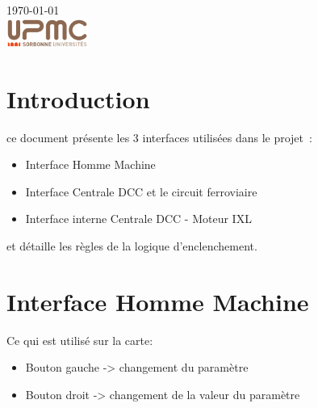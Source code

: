 \begin{titlepage}
{\large \today}\\[2cm] %


\includegraphics[width=0.2\textwidth]{logo.png}


\vfill %

\end{titlepage}




\section{Introduction}
\label{sec:introduction}
ce document présente les  3 interfaces utilisées dans le projet~:
\begin{itemize}
\item Interface Homme Machine
\item Interface Centrale DCC et le circuit ferroviaire
\item Interface interne Centrale DCC - Moteur IXL
\end{itemize}

et détaille les règles de la logique d'enclenchement.


\section{Interface Homme Machine}
\label{sec:int-dcc}
Ce qui est utilisé sur la carte:
\begin{itemize}
\item Bouton gauche -> changement du paramètre
\item Bouton droit  -> changement de la valeur du paramètre
\end{itemize}

